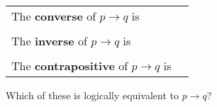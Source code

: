 
\begin{tabular}{ll}
    The {\bf  converse}  of $p \to q$ is & \underline{\phantom{\hspace{1.6in}}}\\
    &  \\
    The {\bf  inverse}  of $p \to q$ is  &\underline{\phantom{\hspace{1.6in}}}\\
    &  \\
    The {\bf  contrapositive}  of $p \to q$ is & \underline{\phantom{\hspace{1.6in}}}
    \end{tabular}
    Which of these is logically equivalent to $p \to q$?
    
    \vfill
    \vfill